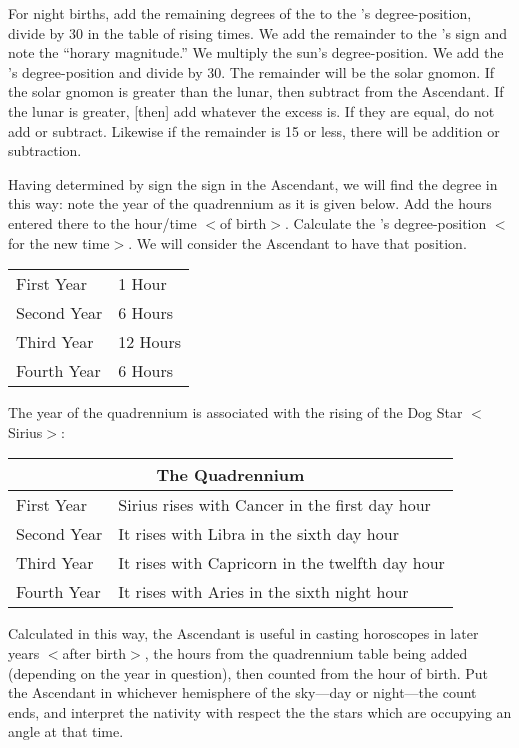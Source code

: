 For night births, add the remaining degrees of the \Moon\xspace to the \Sun’s degree-position, divide by 30 in the table of rising times. We add the remainder to the \Sun’s sign and note the “horary magnitude.” We multiply the sun’s degree-position. We add the \Sun’s degree-position and divide by 30. The remainder will be the solar gnomon. If the solar gnomon is greater than the lunar, then subtract from the Ascendant.
If the lunar is greater, [then] add whatever the excess is. If they are equal, do not add or subtract. Likewise if the remainder is 15 or less, there will be addition or subtraction.

Having determined by sign the sign in the Ascendant, we will find the degree in this way: note the year of the quadrennium as it is given below. Add the hours entered there to the hour/time $<$of birth$>$. Calculate the \Moon’s degree-position $<$for the new time$>$. We will consider the Ascendant to have that position.

\renewcommand{\arraystretch}{1.2}
\begin{table}[h!]
\begin{center}
\begin{tabular}{| p{.3\linewidth} | p{.3\linewidth} |}
\hline
First Year & 1 Hour \\
Second Year & 6 Hours \\
Third Year & 12 Hours \\
Fourth Year & 6 Hours \\
\hline
\end{tabular}
\end{center}
\end{table}

The year of the quadrennium is associated with the rising of the Dog Star $<$Sirius$>$:

\begin{table}
\begin{center}
\begin{tabularx}{\textwidth}	{| l | X |}
\hline
\multicolumn{2}{|c|}{The Quadrennium} \\
\hline
First Year
	& Sirius rises with Cancer in the first day hour \\
Second Year 
	& It rises with Libra in the sixth day hour \\
Third Year 
	& It rises with Capricorn in the twelfth day hour \\
Fourth Year 
	& It rises with Aries in the sixth night hour \\
\hline	
\end{tabularx}
\end{center}
\end{table}
\mnt[0.2cm]
Calculated in this way, the Ascendant is useful in casting horoscopes in later years $<$after birth$>$, the hours from the quadrennium table being added (depending on the year in question), then counted from the hour of birth. Put the Ascendant in whichever hemisphere of the sky—day or night—the count ends, and interpret the nativity with respect the the stars which are occupying an angle at that time.

\newpage